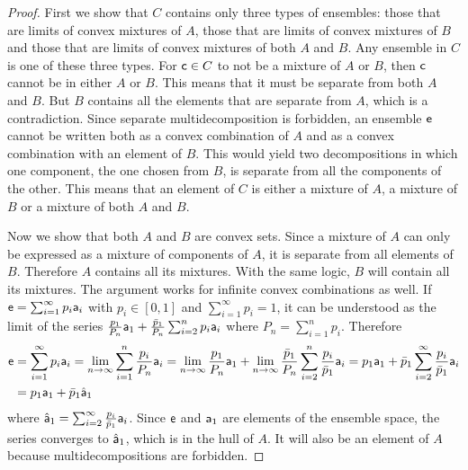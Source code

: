 	\begin{proof}
		First we show that $C$ contains only three types of ensembles: those that are limits of convex mixtures of $A$, those that are limits of convex mixtures of $B$ and those that are limits of convex mixtures of both $A$ and $B$. Any ensemble in $C$ is one of these three types. For $\ens[c] \in C$ to not be a mixture of $A$ or $B$, then $\ens[c]$ cannot be in either $A$ or $B$. This means that it must be separate from both $A$ and $B$. But $B$ contains all the elements that are separate from $A$, which is a contradiction. Since separate multidecomposition is forbidden, an ensemble $\ens$ cannot be written both as a convex combination of $A$ and as a convex combination with an element of $B$. This would yield two decompositions in which one component, the one chosen from $B$, is separate from all the components of the other. This means that an element of $C$ is either a mixture of $A$, a mixture of $B$ or a mixture of both $A$ and $B$.
		
		Now we show that both $A$ and $B$ are convex sets. Since a mixture of $A$ can only be expressed as a mixture of components of $A$, it is separate from all elements of $B$. Therefore $A$ contains all its mixtures. With the same logic, $B$ will contain all its mixtures. The argument works for infinite convex combinations as well. If $\ens = \sum_{i=1}^{\infty} p_i \ens[a]_i$ with $p_i \in [0,1]$ and $\sum_{i=1}^{\infty} p_i = 1$, it can be understood as the limit of the series $\frac{p_1}{P_n} \ens[a]_1 + \frac{\bar{p}_1}{P_n} \sum_{i=2}^{n} p_i \ens[a]_i$ where $P_n = \sum_{i=1}^{n} p_i$. Therefore
		\begin{equation}
			\begin{aligned}
				\ens &= \sum_{i=1}^{\infty} p_i \ens[a]_i = \lim\limits_{n \to \infty}  \sum_{i=1}^{n} \frac{p_i}{P_n} \ens[a]_i = \lim\limits_{n \to \infty} \frac{p_1}{P_n} \ens[a]_1 + \lim\limits_{n \to \infty}\frac{\bar{p}_1}{P_n} \sum_{i=2}^{n} \frac{p_i}{\bar{p}_1} \ens[a]_i = p_1 \ens[a]_1 + \bar{p}_1 \sum_{i=2}^{\infty} \frac{p_i}{\bar{p}_1} \ens[a]_i \\
				&= p_1 \ens[a]_1 + \bar{p}_1 \hat{\ens[a]}_1
			\end{aligned}
		\end{equation}
		where $\hat{\ens[a]}_1 = \sum_{i=2}^{\infty} \frac{p_i}{\bar{p}_1} \ens[a]_i$. Since $\ens$ and $\ens[a]_1$ are elements of the ensemble space, the series converges to $\hat{\ens[a]}_1$, which is in the hull of $A$. It will also be an element of $A$ because multidecompositions are forbidden.
		

\end{proof}
